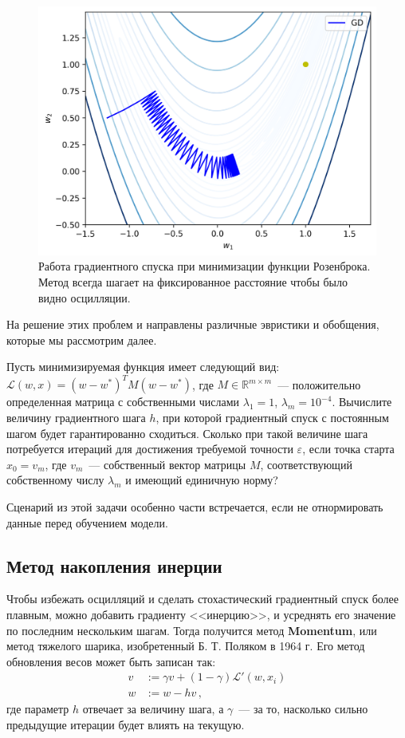 \begin{figure}[h]
	\centering
	\includegraphics[width=0.6\linewidth]{chapters/neural/images/gd_oscillating.png}
	\caption{Работа градиентного спуска при минимизации функции Розенброка. Метод всегда шагает на фиксированное расстояние чтобы было видно осцилляции.}
	\label{img:gd_osc}
\end{figure}

На решение этих проблем и направлены различные эвристики и обобщения, которые мы рассмотрим далее.

\begin{problem}
Пусть минимизируемая функция имеет следующий вид: $\mathcal{L}(w, x) = (w - w^*)^T M (w - w^*)$, где $M \in \mathbb{R}^{m \times m}$~--- положительно определенная матрица с собственными числами $\lambda_1 = 1$, $\lambda_m = 10^{-4}$. Вычислите величину градиентного шага  $h$, при которой градиентный спуск с постоянным шагом будет гарантированно сходиться. Сколько при такой величине шага потребуется итераций для достижения требуемой точности $\varepsilon$, если точка старта $x_0 = v_m$, где $v_m$~--- собственный вектор матрицы $M$, соответствующий собственному числу $\lambda_m$ и имеющий единичную норму?
\end{problem}

\begin{remark}
	Сценарий из этой задачи особенно части встречается, если не отнормировать данные перед обучением модели.
\end{remark}

\subsection{Метод накопления инерции}

Чтобы избежать осцилляций и сделать стохастический градиентный спуск более плавным, можно добавить градиенту <<инерцию>>, и усреднять его значение по последним нескольким шагам. Тогда получится метод \textbf{Momentum}, или метод тяжелого шарика, изобретенный Б. Т. Поляком в 1964 г. Его метод обновления весов может быть записан так:
\begin{align*}
	v & := \gamma v + (1 - \gamma) \mathcal{L}'(w, x_i) \\
	w & := w - h v\,,
\end{align*}
где параметр $h$ отвечает за величину шага, а $\gamma$~--- за то, насколько сильно предыдущие итерации будет влиять на текущую.


